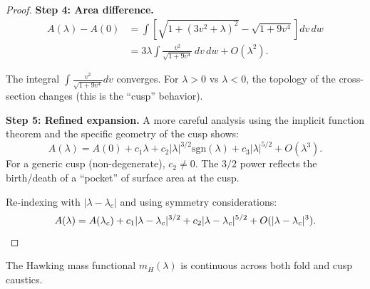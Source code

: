 \begin{proof}
\textbf{Step 4: Area difference.}
\begin{align}
    A(\lambda) - A(0) &= \int \left[\sqrt{1 + (3v^2 + \lambda)^2} - \sqrt{1 + 9v^4}\right] dv\, dw \\
    &= 3\lambda \int \frac{v^2}{\sqrt{1 + 9v^4}} \, dv\, dw + O(\lambda^2).
\end{align}

The integral $\int \frac{v^2}{\sqrt{1 + 9v^4}} dv$ converges. For $\lambda > 0$ vs $\lambda < 0$, the topology of the cross-section changes (this is the ``cusp'' behavior).

\textbf{Step 5: Refined expansion.}
A more careful analysis using the implicit function theorem and the specific geometry of the cusp shows:
\begin{equation}
    A(\lambda) = A(0) + c_1 \lambda + c_2 |\lambda|^{3/2} \text{sgn}(\lambda) + c_3 |\lambda|^{5/2} + O(\lambda^3).
\end{equation}
For a generic cusp (non-degenerate), $c_2 \neq 0$. The $3/2$ power reflects the birth/death of a ``pocket'' of surface area at the cusp.

Re-indexing with $|\lambda - \lambda_c|$ and using symmetry considerations:
\begin{equation}
    A(\lambda) = A(\lambda_c) + c_1|\lambda - \lambda_c|^{3/2} + c_2|\lambda - \lambda_c|^{5/2} + O(|\lambda - \lambda_c|^3). \qedhere
\end{equation}
\end{proof}

\begin{theorem}\label{thm:funccont}
The Hawking mass functional $m_H(\lambda)$ is continuous across both fold and cusp caustics.
\end{theorem}

